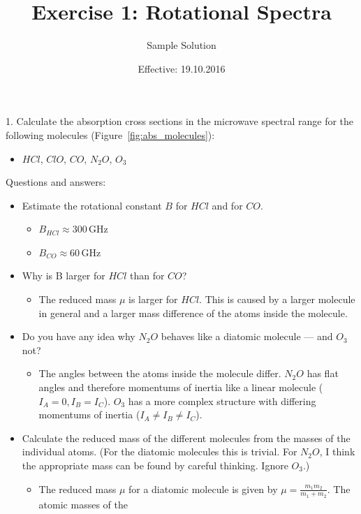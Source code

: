 \documentclass[paper=a4, fontsize=11pt]{scrartcl}
\title{Exercise 1: Rotational Spectra}
\author{Sample Solution}
\date{Effective: 19.10.2016}
\begin{document}
\maketitle

1. Calculate the absorption cross sections in the microwave spectral range for the
following molecules (Figure~\ref{fig:abs_molecules}):
\begin{itemize}
    \item $HCl$, $ClO$, $CO$, $N_2O$, $O_3$
\end{itemize}

Questions and answers:
\begin{itemize}
    \item Estimate the rotational constant $B$ for $HCl$ and for $CO$.
    \begin{itemize}
        \item $B_{HCl} \approx 300$\,GHz
        \item $B_{CO} \approx 60$\,GHz
    \end{itemize}
    \item Why is B larger for $HCl$ than for $CO$?
    \begin{itemize}
        \item The reduced mass $\mu$ is larger for $HCl$. This is caused by a
            larger molecule in general and a larger mass difference of the
            atoms inside the molecule.
    \end{itemize}
    \item Do you have any idea why $N_{2}O$ behaves like a diatomic molecule
        --- and $O_{3}$ not?
    \begin{itemize}
        \item The angles between the atoms inside the molecule differ. $N_2O$
            has flat angles and therefore momentums of inertia like a linear
            molecule ($I_A = 0, I_B = I_C$). $O_3$ has a more complex structure
            with differing momentums of inertia ($I_A \neq I_B \neq I_C$).
    \end{itemize}
    \item Calculate the reduced mass of the different molecules from the masses
        of the individual atoms. (For the diatomic molecules this is trivial.
        For $N_2O$, I think the appropriate mass can be found by careful
        thinking. Ignore $O_3$.)
        \begin{itemize}
          \item The reduced mass $\mu$ for a diatomic molecule is given by
            $\mu = \frac{m_1m_2}{m_1 + m_2}$. The atomic masses of the

\end{itemize}
\end{itemize}
\end{document}
